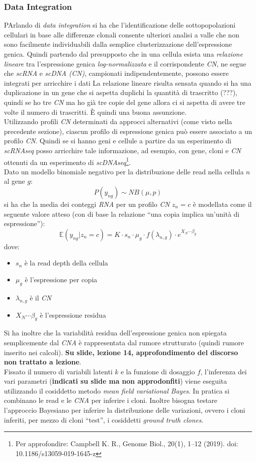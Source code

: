 \documentclass[a4paper,12pt, oneside]{book}
\begin{document}
\subsubsection{Data Integration}
PArlando di \textit{data integration} si ha che l'identificazione delle
sottopopolazioni cellulari in base alle differenze clonali consente ulteriori
analisi a valle che non sono facilmente individuabili dalla semplice
clusterizzazione dell'espressione genica. Quindi partendo dal presupposto che in
una cellula esista una \textit{relazione lineare} tra l'espressione genica
\textit{log-normalizzata} e il corrispondente \textit{CN}, ne segue che
\textit{scRNA} e \textit{scDNA (CN)}, campionati indipendentemente, possono
essere integrati per arricchire i dati La relazione lineare risulta sensata
quando si ha una duplicazione in un gene che si aspetta duplichi la quantità di
trascritto (???), quindi se ho tre \textit{CN} ma ho già tre copie del gene
allora ci si aspetta di avere tre volte il numero di trascritti. È quindi una
buona assunzione.\\
Utilizzando profili \textit{CN} determinati da 
approcci alternativi (come visto nella precedente sezione), ciascun profilo di
espressione genica può essere associato a un profilo \textit{CN}. Quindi se si
hanno geni e cellule a partire da un esperimento di \textit{scRNAseq} posso
arricchire tale informazione, ad esempio, con gene, cloni e \textit{CN}
ottenuti da un esperimento di \textit{scDNAseq}\footnote{Per approfondire:
  Campbell K. R., Genome Biol., 20(1), 1–12 (2019). doi:
  10.1186/s13059-019-1645-z}. \\
Dato un modello binomiale negativo per la distribuzione delle read nella cellula
$n$ al gene $g$:
\[P(y_{ng})\sim NB(\mu, p)\]
si ha che la media dei conteggi \textit{RNA} per un profilo \textit{CN} $z_n=c$
è modellata come il seguente valore atteso (con di base la relazione ``una copia
implica un'unità di espressione''):
\[\mathbb{E}(y_{ng}|z_n=c)=K\cdot s_n\cdot\mu_g\cdot f(\lambda_{n,g})\cdot
  e^{X_N\cdots \beta_g}\]
dove:
\begin{itemize}
  \item $s_n$ è la read depth della cellula
  \item $\mu_g$ è l'espressione per copia
  \item $\lambda_{n,g}$ è il \textit{CN}
  \item $X_N\cdots \beta_g$ è l'espressione residua
\end{itemize}
Si ha inoltre che la variabilità residua dell'espressione genica non spiegata
semplicemente dal \textit{CNA} è rappresentata dal rumore strutturato (quindi
rumore inserito nei calcoli). \textbf{Su slide, lezione 14, approfondimento del
  discorso non trattato a lezione}.\\
Fissato il numero di variabili latenti $k$ e la funzione di dosaggio $f$,
l'inferenza dei vari parametri (\textbf{indicati su slide ma non approdonfiti})
viene eseguita utilizzando il cosiddetto metodo \textit{mean field variational
  Bayes}. In pratica si combinano le read e le \textit{CNA} per inferire i
cloni. Inoltre bisogna testare l'approccio Bayesiano per inferire la
distribuzione delle variazioni, ovvero i cloni inferiti, per mezzo
di cloni ``test'', i cosiddetti \textit{ground truth clones}.
\end{document}
